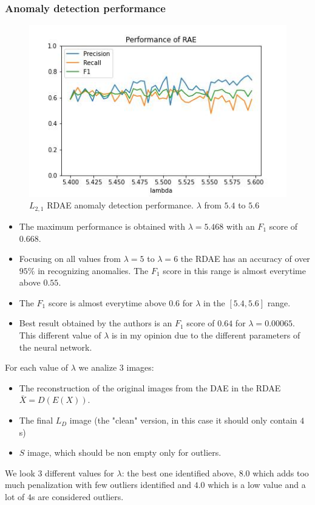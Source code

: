 \documentclass{beamer}
\theoremstyle{plain}
\theoremstyle{definition}
\theoremstyle{remark}
\begin{document}
\begin{frame}
	\frametitle{Anomaly detection performance}
	\begin{figure}
		\centering
		\includegraphics[width=0.8\linewidth]{Images/l21_experiment_from_5.4_to_5.6.jpg}
		\caption[]{$L_{2,1}$ RDAE anomaly detection performance. $\lambda$ from $5.4$ to $5.6$}
	\end{figure}
\end{frame}

\begin{frame}
	\begin{itemize}
		\item The maximum performance is obtained with $\lambda=5.468$ with an $F_1$ score of $0.668$.
		\item Focusing on all values from $\lambda=5$ to $\lambda=6$ the RDAE has an accuracy of over $95\%$ in recognizing anomalies. The $F_1$ score in this range is almost everytime above $0.55$.
		\item The $F_1$ score is almost everytime above $0.6$ for $\lambda$ in the $[5.4, 5.6]$ range.
		\item Best result obtained by the authors is an $F_1$ score of $0.64$ for $\lambda=0.00065$. This different value of $\lambda$ is in my opinion due to the different parameters of the neural network.
	\end{itemize}
\end{frame}

\begin{frame}
	For each value of $\lambda$ we analize $3$ images:
	\begin{itemize}
		\item The reconstruction of the original images from the DAE in the RDAE $\bar{X} = D(E(X))$.
		\item The final $L_D$ image (the "clean" version, in this case it should only contain $4$s) 
		\item $S$ image, which should be non empty only for outliers.
	\end{itemize}
	We look $3$ different values for $\lambda$: the best one identified above, $8.0$ which adds too much penalization with few outliers identified and $4.0$ which is a low value and a lot of $4$s are considered outliers.
\end{frame}
\end{document}
